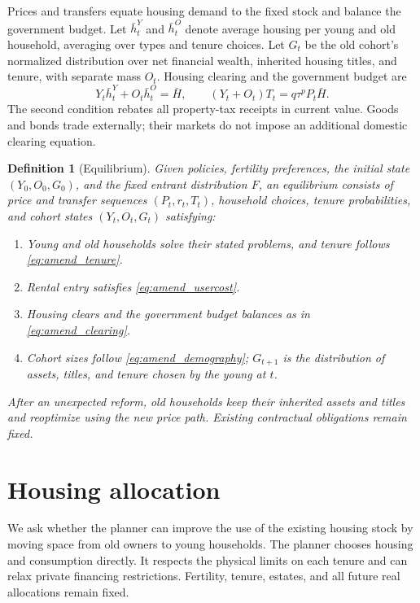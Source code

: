 \documentclass[11pt]{article}
\newtheorem{definition}{Definition}
\begin{document}
Prices and transfers equate housing demand to the fixed stock and balance the
government budget. Let $\bar h_t^Y$ and $\bar h_t^O$ denote average housing per
young and old household, averaging over types and tenure choices. Let $G_t$
be the old cohort's normalized distribution over net financial wealth,
inherited housing titles, and tenure, with separate mass $O_t$.
Housing clearing and the government budget are
\begin{equation}
 Y_t\bar h_t^Y+O_t\bar h_t^O=\bar H,\qquad
 (Y_t+O_t)T_t=q\tau^p P_t\bar H.
 \label{eq:amend_clearing}
\end{equation}
The second condition rebates all property-tax receipts in current value.
Goods and bonds trade externally; their markets do not impose an additional
domestic clearing equation.

\begin{definition}[Equilibrium]
Given policies, fertility preferences, the initial state $(Y_0,O_0,G_0)$,
and the fixed entrant distribution $F$, an equilibrium consists of price and
transfer sequences $(P_t,r_t,T_t)$, household choices, tenure probabilities,
and cohort states $(Y_t,O_t,G_t)$ satisfying:
\begin{enumerate}[label=(\roman*),nosep,leftmargin=*]
 \item Young and old households solve their stated problems, and tenure
 follows \eqref{eq:amend_tenure}.
 \item Rental entry satisfies \eqref{eq:amend_usercost}.
 \item Housing clears and the government budget balances as in
 \eqref{eq:amend_clearing}.
 \item Cohort sizes follow \eqref{eq:amend_demography}; $G_{t+1}$ is the
 distribution of assets, titles, and tenure chosen by the young at $t$.
\end{enumerate}
After an unexpected reform, old households keep their inherited assets and
titles and reoptimize using the new price path. Existing contractual
obligations remain fixed.
\end{definition}

\section{Housing allocation}

We ask whether the planner can improve the use of the existing housing stock
by moving space from old owners to young households. The planner chooses
housing and consumption directly. It respects the physical limits on each
tenure and can relax private financing restrictions. Fertility, tenure,
estates, and all future real allocations remain fixed.
\end{document}
